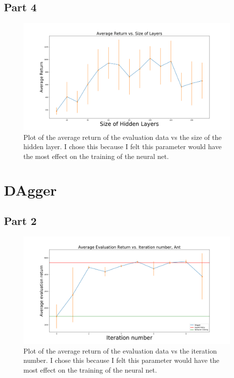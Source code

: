 \documentclass{article}
\begin{document}
\subsection{Part 4}

\begin{figure}[H]
  \centering
  \includegraphics[width=1\linewidth]{irl_ass1_1.3.png}
  \caption{Plot of the average return of the evaluation data vs the size of the hidden layer. I chose this because I felt this parameter would have the most effect on the training of the neural net.}
  \label{fig:1.3}
\end{figure}

\section{DAgger}
\subsection{Part 2}
\begin{figure}[H]
  \centering
  \includegraphics[width=1\linewidth]{irl_ass1_2.1_ant.png}
  \caption{Plot of the average return of the evaluation data vs the iteration number. I chose this because I felt this parameter would have the most effect on the training of the neural net.}
  \label{fig:1.3}
\end{figure}
\end{document}
